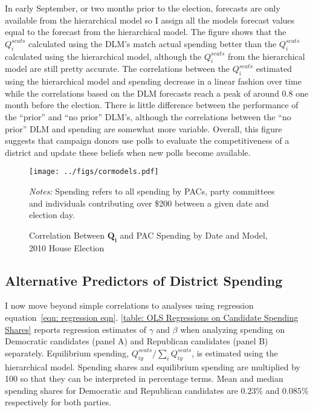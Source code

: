 \documentclass[12pt,final,fleqn]{article}
\theoremstyle{plain}
\begin{document}
In early September, or two months prior to the election, forecasts are only available from the hierarchical model so I assign all the models forecast values equal to the forecast from the hierarchical model. The figure shows that the $Q_i^{seats}$ calculated using the DLM's match actual spending better than the $Q_i^{seats}$ calculated using the hierarchical model, although the $Q_i^{seats}$ from the hierarchical model are still pretty accurate. The correlations between the $Q_i^{seats}$ estimated using the hierarchical model and spending decrease in a linear fashion over time while the correlations based on the DLM forecasts reach a peak of around 0.8 one month before the election.  There is little difference between the performance of the ``prior'' and ``no prior'' DLM's, although the correlations between the ``no prior'' DLM and spending are somewhat more variable. Overall, this figure suggests that campaign donors use polls to evaluate the competitiveness of a district and update these beliefs when new polls become available.

\begin{figure}[!htb]
\texttt{[image: ../figs/cormodels.pdf]}
\vspace{.5cm}
\caption{Correlation Between $\mathbf{Q_i}$ and PAC Spending by Date and Model, 2010 House Election}
\label{fig:Correlation Between Q and PAC Spending by Date and Model, 2010 House Election}
\begin{minipage}{\linewidth}
\footnotesize
\emph{Notes:} Spending refers to all spending by PACs, party committees and individuals contributing over \$200 between a given date and election day.
\end{minipage}
\end{figure}

\subsection{Alternative Predictors of District Spending}
I now move beyond simple correlations to analyses using regression equation~\ref{eqn: regression eqn}. \autoref{table: OLS Regressions on Candidate Spending Shares} reports regression estimates of $\gamma$ and $\beta$ when analyzing spending on Democratic candidates (panel A) and Republican candidates (panel B) separately. Equilibrium spending, $Q_{iy}^{seats}/ \sum_i Q_{iy}^{seats}$, is estimated using the hierarchical model. Spending shares and equilibrium spending are multiplied by 100 so that they can be interpreted in percentage terms. Mean and median spending shares for Democratic and Republican candidates are $0.23\%$ and $0.085\%$ respectively for both parties.
\end{document}
